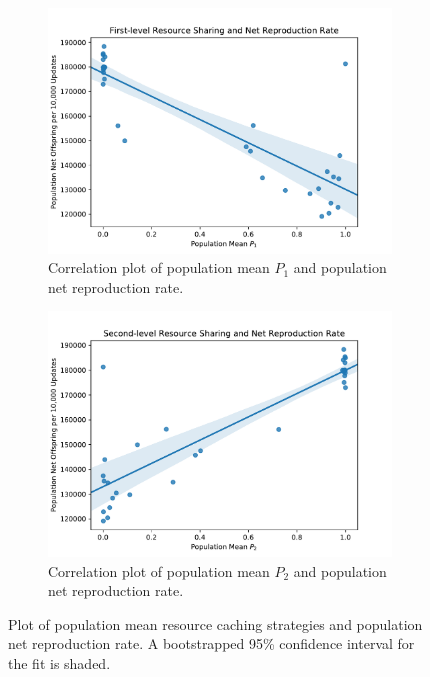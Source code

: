 \begin{figure}[t]
\begin{center}

\begin{subfigure}[b]{\columnwidth}
  \includegraphics[width=\columnwidth]{img/mean_res_pool1_vs_net_reproduction}
  \caption{
  Correlation plot of population mean $P_1$ and population net reproduction rate.
  }
  \label{fig:mean_res_pool1_vs_net_reproduction}
\end{subfigure}

\begin{subfigure}[b]{\columnwidth}
  \includegraphics[width=\columnwidth]{img/mean_res_pool2_vs_net_reproduction}
  \caption{
  Correlation plot of population mean $P_2$ and population net reproduction rate.
  }
  \label{fig:mean_res_pool2_vs_net_reproduction}
\end{subfigure}

\caption{
Plot of population mean resource caching strategies and population net reproduction rate.
A bootstrapped 95\% confidence interval for the fit is shaded.
}
\label{fig:net_reproduction}
\end{center}
\end{figure}
